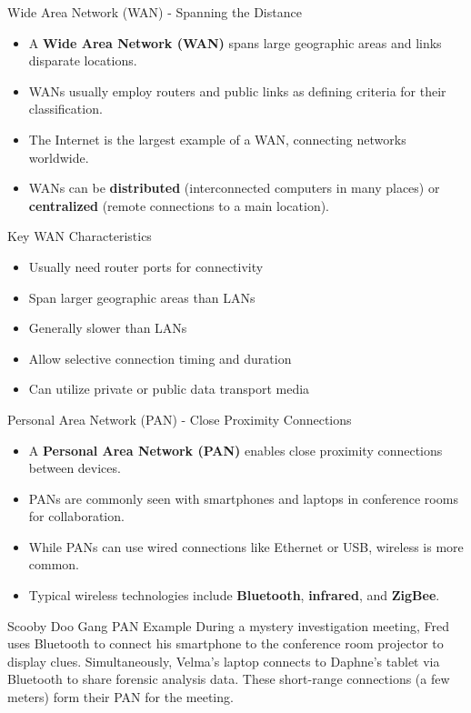 \documentclass[aspectratio=169]{beamer}
\begin{document}
	\begin{frame}{Wide Area Network (WAN) - Spanning the Distance}
		\begin{itemize}
			\item A \textbf{Wide Area Network (WAN)} spans large geographic areas and links disparate locations.
			\item WANs usually employ routers and public links as defining criteria for their classification.
			\item The Internet is the largest example of a WAN, connecting networks worldwide.
			\item WANs can be \textbf{distributed} (interconnected computers in many places) or \textbf{centralized} (remote connections to a main location).
		\end{itemize}
		
		\begin{block}{Key WAN Characteristics}
			\begin{itemize}
				\item Usually need router ports for connectivity
				\item Span larger geographic areas than LANs
				\item Generally slower than LANs
				\item Allow selective connection timing and duration
				\item Can utilize private or public data transport media
			\end{itemize}
		\end{block}
	\end{frame}
	
	\begin{frame}{Personal Area Network (PAN) - Close Proximity Connections}
		\begin{itemize}
			\item A \textbf{Personal Area Network (PAN)} enables close proximity connections between devices.
			\item PANs are commonly seen with smartphones and laptops in conference rooms for collaboration.
			\item While PANs can use wired connections like Ethernet or USB, wireless is more common.
			\item Typical wireless technologies include \textbf{Bluetooth}, \textbf{infrared}, and \textbf{ZigBee}.
		\end{itemize}
		
		\begin{exampleblock}{Scooby Doo Gang PAN Example}
			During a mystery investigation meeting, Fred uses Bluetooth to connect his smartphone to the conference room projector to display clues. Simultaneously, Velma's laptop connects to Daphne's tablet via Bluetooth to share forensic analysis data. These short-range connections (a few meters) form their PAN for the meeting.
		\end{exampleblock}
	\end{frame}
	
\end{document}
